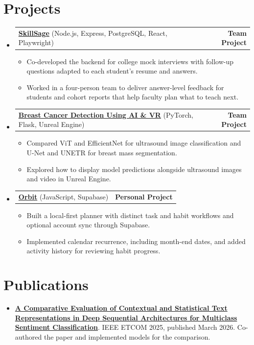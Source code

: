 \documentclass[letterpaper,10pt]{article}
\makeatletter
\newcommand{\resumeItem}[1]{\item\footnotesize{#1\vspace{-1pt}}}
\newcommand{\resumeProjectHeading}[2]{%
    \item%
    \begin{tabular*}{1.0\textwidth}{l@{\extracolsep{\fill}}r}%
      \footnotesize #1 & \textbf{\footnotesize #2} \\%
    \end{tabular*}%
}
\newcommand{\resumeSubHeadingListStart}{\begin{itemize}[leftmargin=0in, label={}, itemsep=0pt, topsep=0pt]}
\newcommand{\resumeSubHeadingListEnd}{\end{itemize}}
\newcommand{\resumeItemListStart}{\begin{itemize}[itemsep=0pt, topsep=0pt]}
\newcommand{\resumeItemListEnd}{\end{itemize}\vspace{-2pt}}
\makeatother
\begin{document}
\section{Projects}
\resumeSubHeadingListStart
  \resumeProjectHeading
      {\textbf{\href{https://github.com/Baba-Gandhi-Kandagatla/SkillSage}{SkillSage}} \textnormal{(Node.js, Express, PostgreSQL, React, Playwright)}}{Team Project}
      \resumeItemListStart
          \resumeItem{Co-developed the backend for college mock interviews with follow-up questions adapted to each student's resume and answers.}
          \resumeItem{Worked in a four-person team to deliver answer-level feedback for students and cohort reports that help faculty plan what to teach next.}
      \resumeItemListEnd
  \vspace{1.5mm}
  \resumeProjectHeading
      {\textbf{\href{https://github.com/Baba-Gandhi-Kandagatla/BreastTumorDetectionVR}{Breast Cancer Detection Using AI \& VR}} \textnormal{(PyTorch, Flask, Unreal Engine)}}{Team Project}
      \resumeItemListStart
          \resumeItem{Compared ViT and EfficientNet for ultrasound image classification and U-Net and UNETR for breast mass segmentation.}
          \resumeItem{Explored how to display model predictions alongside ultrasound images and video in Unreal Engine.}
      \resumeItemListEnd
  \vspace{1.5mm}
  \resumeProjectHeading
      {\textbf{\href{https://github.com/Baba-Gandhi-Kandagatla/Orbit}{Orbit}} \textnormal{(JavaScript, Supabase)}}{Personal Project}
      \resumeItemListStart
          \resumeItem{Built a local-first planner with distinct task and habit workflows and optional account sync through Supabase.}
          \resumeItem{Implemented calendar recurrence, including month-end dates, and added activity history for reviewing habit progress.}
      \resumeItemListEnd
\resumeSubHeadingListEnd
\vspace{-.5em}

\section{Publications}
\begin{itemize}[leftmargin=0.15in, itemsep=0pt, topsep=0pt]
    \item \footnotesize \href{https://doi.org/10.1109/ETCOM66606.2025.11436537}{\textbf{A Comparative Evaluation of Contextual and Statistical Text Representations in Deep Sequential Architectures for Multiclass Sentiment Classification}}. IEEE ETCOM 2025, published March 2026. Co-authored the paper and implemented models for the comparison.
\end{itemize}
\vspace{-.5em}
\end{document}
